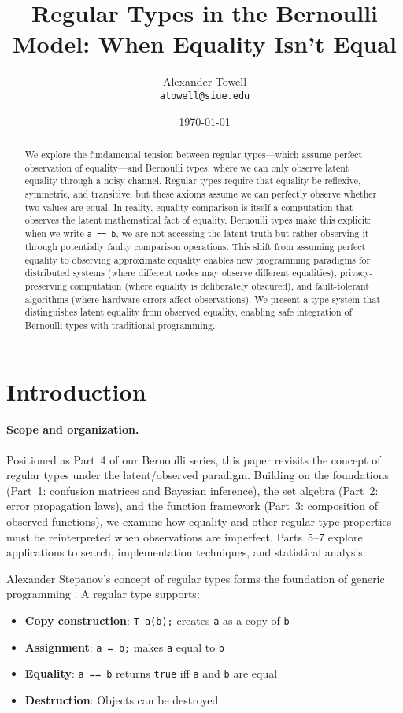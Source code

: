 \documentclass[11pt,final,hidelinks]{article}
\title{Regular Types in the Bernoulli Model: When Equality Isn't Equal}
\author{
    Alexander Towell\\
    \texttt{atowell@siue.edu}
}
\date{\today}
\newcommand{\code}[1]{\texttt{#1}}
\begin{document}
\maketitle
\NotationSection

\begin{abstract}
We explore the fundamental tension between regular types—which assume perfect observation of equality—and Bernoulli types, where we can only observe latent equality through a noisy channel. Regular types require that equality be reflexive, symmetric, and transitive, but these axioms assume we can perfectly observe whether two values are equal. In reality, equality comparison is itself a computation that observes the latent mathematical fact of equality. Bernoulli types make this explicit: when we write \code{a == b}, we are not accessing the latent truth but rather observing it through potentially faulty comparison operations. This shift from assuming perfect equality to observing approximate equality enables new programming paradigms for distributed systems (where different nodes may observe different equalities), privacy-preserving computation (where equality is deliberately obscured), and fault-tolerant algorithms (where hardware errors affect observations). We present a type system that distinguishes latent equality from observed equality, enabling safe integration of Bernoulli types with traditional programming.
\end{abstract}

\section{Introduction}

\paragraph{Scope and organization.}  Positioned as Part~4 of our Bernoulli series, this paper revisits the concept of regular types under the latent/observed paradigm.  Building on the foundations (Part~1: confusion matrices and Bayesian inference), the set algebra (Part~2: error propagation laws), and the function framework (Part~3: composition of observed functions), we examine how equality and other regular type properties must be reinterpreted when observations are imperfect.  Parts~5--7 explore applications to search, implementation techniques, and statistical analysis.

Alexander Stepanov's concept of regular types forms the foundation of generic programming \cite{stepanov2014}. A regular type supports:
\begin{itemize}
    \item \textbf{Copy construction}: \code{T a(b);} creates \code{a} as a copy of \code{b}
    \item \textbf{Assignment}: \code{a = b;} makes \code{a} equal to \code{b}
    \item \textbf{Equality}: \code{a == b} returns \code{true} iff \code{a} and \code{b} are equal
    \item \textbf{Destruction}: Objects can be destroyed
\end{itemize}
\end{document}
